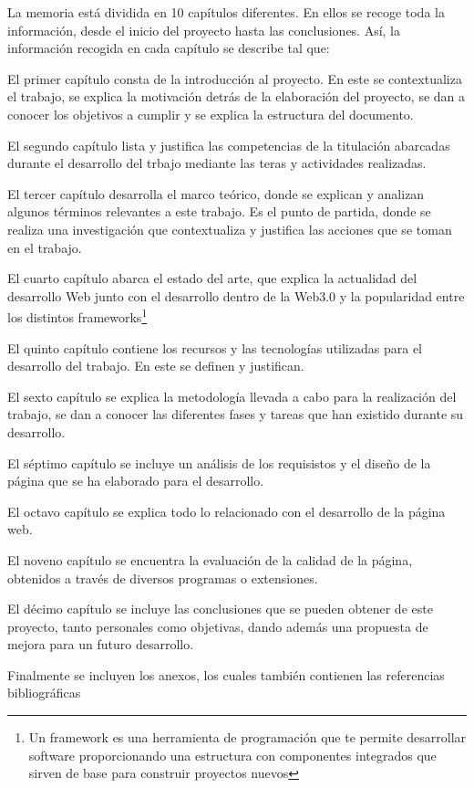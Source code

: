 La memoria está dividida en 10 capítulos diferentes. En ellos se recoge toda
la información, desde el inicio del proyecto hasta las conclusiones. Así, 
la información recogida en cada capítulo se describe tal que:

\-\hspace{1cm} El primer capítulo consta de la introducción al proyecto. En este se 
contextualiza el trabajo, se explica la motivación detrás de la elaboración 
del proyecto, se dan a conocer los objetivos a cumplir y se explica la 
estructura del documento.

\-\hspace{1cm} El segundo capítulo lista y justifica las competencias de la titulación
abarcadas durante el desarrollo del trbajo mediante las teras y actividades realizadas.

\-\hspace{1cm} El tercer capítulo desarrolla el marco teórico, donde se explican y 
analizan algunos términos relevantes a este trabajo. Es el punto de partida, 
donde se realiza una investigación que contextualiza y justifica las acciones
que se toman en el trabajo.

\-\hspace{1cm} El cuarto capítulo abarca el estado del arte, que explica la 
actualidad del desarrollo Web junto con el desarrollo dentro de la Web3.0 y 
la popularidad entre los distintos frameworks\footnote{Un framework es una 
herramienta de programación que te permite desarrollar software proporcionando 
una estructura con componentes integrados que sirven de base para construir 
proyectos nuevos\cite{bootcampFramework}}

\-\hspace{1cm} El quinto capítulo contiene los recursos y las tecnologías 
utilizadas para el desarrollo del trabajo. En este se definen y justifican.

\-\hspace{1cm} El sexto capítulo se explica la metodología llevada a cabo 
para la realización del trabajo, se dan a conocer las diferentes fases y 
tareas que han existido durante su desarrollo.

\-\hspace{1cm} El séptimo capítulo se incluye un análisis de los requisistos y 
el diseño de la página que se ha elaborado para el desarrollo.

\-\hspace{1cm} El octavo capítulo se explica todo lo relacionado con el 
desarrollo de la página web.

\-\hspace{1cm} El noveno capítulo se encuentra la evaluación de la calidad de la página, 
obtenidos a través de diversos programas o extensiones.

\-\hspace{1cm} El décimo capítulo se incluye las conclusiones que se pueden obtener 
de este proyecto, tanto personales como objetivas, dando además una propuesta de mejora 
para un futuro desarrollo.

\-\hspace{1cm} Finalmente se incluyen los anexos, los cuales también contienen las 
referencias bibliográficas